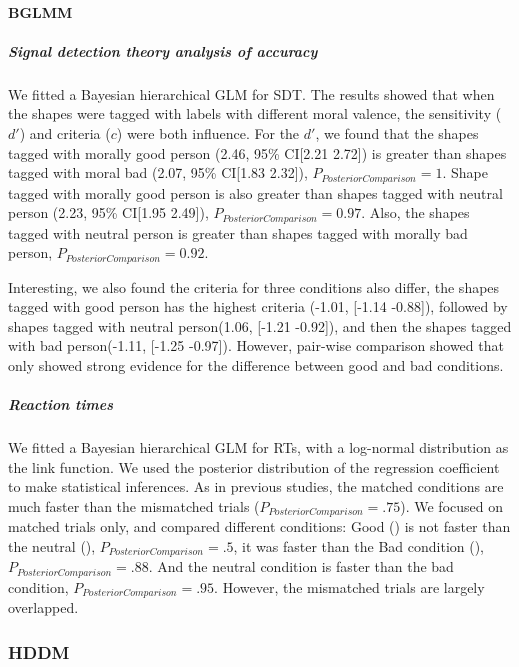 \documentclass[
  english,
  man]{apa6}
\let\oldparagraph\paragraph
\renewcommand{\paragraph}[1]{\oldparagraph{#1}\mbox{}}
\let\oldsubparagraph\subparagraph
\renewcommand{\subparagraph}[1]{\oldsubparagraph{#1}\mbox{}}
\begin{document}
\hypertarget{bglmm}{%
\paragraph{BGLMM}\label{bglmm}}

\hypertarget{signal-detection-theory-analysis-of-accuracy-2}{%
\subparagraph{Signal detection theory analysis of accuracy}\label{signal-detection-theory-analysis-of-accuracy-2}}

We fitted a Bayesian hierarchical GLM for SDT. The results showed that when the shapes were tagged with labels with different moral valence, the sensitivity (\(d'\)) and criteria (\(c\)) were both influence. For the \(d'\), we found that the shapes tagged with morally good person (2.46, 95\% CI{[}2.21 2.72{]}) is greater than shapes tagged with moral bad (2.07, 95\% CI{[}1.83 2.32{]}), \(P_{PosteriorComparison} = 1\). Shape tagged with morally good person is also greater than shapes tagged with neutral person (2.23, 95\% CI{[}1.95 2.49{]}), \(P_{PosteriorComparison} = 0.97\). Also, the shapes tagged with neutral person is greater than shapes tagged with morally bad person, \(P_{PosteriorComparison} = 0.92\).

Interesting, we also found the criteria for three conditions also differ, the shapes tagged with good person has the highest criteria (-1.01, {[}-1.14 -0.88{]}), followed by shapes tagged with neutral person(1.06, {[}-1.21 -0.92{]}), and then the shapes tagged with bad person(-1.11, {[}-1.25 -0.97{]}). However, pair-wise comparison showed that only showed strong evidence for the difference between good and bad conditions.

\hypertarget{reaction-times-2}{%
\subparagraph{Reaction times}\label{reaction-times-2}}

We fitted a Bayesian hierarchical GLM for RTs, with a log-normal distribution as the link function. We used the posterior distribution of the regression coefficient to make statistical inferences. As in previous studies, the matched conditions are much faster than the mismatched trials (\(P_{PosteriorComparison} = .75\)). We focused on matched trials only, and compared different conditions: Good () is not faster than the neutral (), \(P_{PosteriorComparison} = .5\), it was faster than the Bad condition (), \(P_{PosteriorComparison} = .88\). And the neutral condition is faster than the bad condition, \(P_{PosteriorComparison} = .95\). However, the mismatched trials are largely overlapped.

\hypertarget{hddm-3}{%
\subsubsection{HDDM}\label{hddm-3}}
\end{document}
